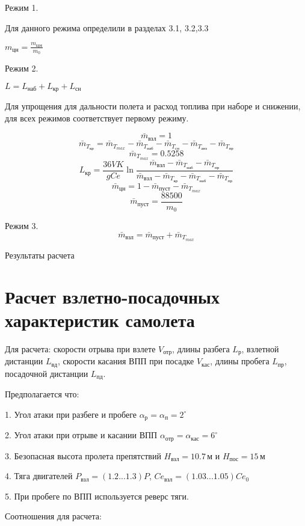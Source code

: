 Режим 1.

Для данного режима определили в разделах 3.1, 3.2,3.3

$m_{цн} = \frac{m_{ЦН}}{m_0}$

Режим 2.

$ L = L_{наб} + L_{кр} + L_{сн} $

Для упрощения для дальности полета и расход топлива при наборе и снижении,
для всех режимов соответствует первому режиму.

\[
    \bar{m}_{взл} = 1
\]
\[
    \bar{m}_{T_{кр}} = \bar{m}_{T_{max}}- \bar{m}_{T_{наб}} -
\bar{m}_{T_{сн}} - \bar{m}_{T_{анз}} - \bar{m}_{T_{пр}} 
\]
\[
\bar{m}_{T_{max}} = 0.5258
\]
\[
    L_{кр} = \frac{36 V K}{gCe} \ln{\frac{\bar{m}_{взл} - \bar{m}_{T_{наб}} - \bar{m}_{T_{пр}}}{\bar{m}_{взл}-\bar{m}_{T_{кр}}-\bar{m}_{T_{наб}} - \bar{m}_{T_{пр}}}}
\]
\[
    \bar{m}_{цн} = 1 - \bar{m}_{пуст} - \bar{m}_{T_{max}}
\]
\[
    \bar{m}_{пуст} = \frac{88500}{m_0}
\]

Режим 3.
\[
    \bar{m}_{взл} = \bar{m}_{пуст} + \bar{m}_{T_{max}}
\]


\begin{table}[H]
    \centering
    \caption{Результаты расчета}
    \label{tab:cargo_load}
    
\end{table}



\section{Расчет взлетно-посадочных характеристик самолета}


Для расчета: скорости отрыва при взлете $V_{отр}$, длины разбега
$L_{р}$, взлетной дистанции
$L_{вд}$, скорости касания ВПП при посадке
$V_{кас}$, длины пробега
$L_{пр}$, посадочной дистанции
$L_{пд}$.

Предполагается что:

1. Угол атаки при разбеге и пробеге $\alpha_р = \alpha_{п} = 2^\circ$ 

2. Угол атаки при отрыве и касании ВПП $\alpha_{отр} = \alpha_{кас} = 6^\circ$

3. Безопасная высота пролета препятствий $H_{взл} = 10.7\, м$ и $H_{пос} = 15\, м$

4. Тяга двигателей $P_{взл} = (1.2 ... 1.3)P$, $Ce_{взл} = (1.03 ... 1.05) Ce_0$ 

5. При пробеге по ВПП используется реверс тяги.

Соотношения для расчета:

